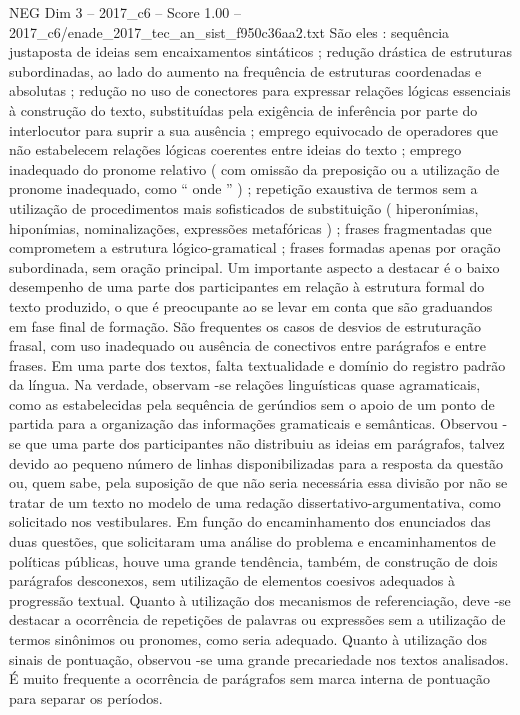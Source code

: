 \begin{textsample}{NEG Dim 3 – 2017\_c6 – Score 1.00 – 2017\_c6/enade\_2017\_tec\_an\_sist\_f950c36aa2.txt}
São eles : sequência justaposta de ideias sem encaixamentos sintáticos ; redução drástica de estruturas subordinadas, ao lado do aumento na frequência de estruturas coordenadas e absolutas ; redução no uso de conectores para expressar relações lógicas essenciais à construção do texto, substituídas pela exigência de inferência por parte do interlocutor para suprir a sua ausência ; emprego equivocado de operadores que não estabelecem relações lógicas coerentes entre ideias do texto ; emprego inadequado do pronome relativo ( com omissão da preposição ou a utilização de pronome inadequado, como “ onde ” ) ; repetição exaustiva de termos sem a utilização de procedimentos mais sofisticados de substituição ( hiperonímias, hiponímias, nominalizações, expressões metafóricas ) ; frases fragmentadas que comprometem a estrutura lógico-gramatical ; frases formadas apenas por oração subordinada, sem oração principal.
Um importante aspecto a destacar é o baixo desempenho de uma parte dos participantes em relação à estrutura formal do texto produzido, o que é preocupante ao se levar em conta que são graduandos em fase final de formação.
São frequentes os casos de desvios de estruturação frasal, com uso inadequado ou ausência de conectivos entre parágrafos e entre frases.
Em uma parte dos textos, falta textualidade e domínio do registro padrão da língua.
Na verdade, observam -se relações linguísticas quase agramaticais, como as estabelecidas pela sequência de gerúndios sem o apoio de um ponto de partida para a organização das informações gramaticais e semânticas.
Observou -se que uma parte dos participantes não distribuiu as ideias em parágrafos, talvez devido ao pequeno número de linhas disponibilizadas para a resposta da questão ou, quem sabe, pela suposição de que não seria necessária essa divisão por não se tratar de um texto no modelo de uma redação dissertativo-argumentativa, como solicitado nos vestibulares.
Em função do encaminhamento dos enunciados das duas questões, que solicitaram uma análise do problema e encaminhamentos de políticas públicas, houve uma grande tendência, também, de construção de dois parágrafos desconexos, sem utilização de elementos coesivos adequados à progressão textual.
Quanto à utilização dos mecanismos de referenciação, deve -se destacar a ocorrência de repetições de palavras ou expressões sem a utilização de termos sinônimos ou pronomes, como seria adequado.
Quanto à utilização dos sinais de pontuação, observou -se uma grande precariedade nos textos analisados.
É muito frequente a ocorrência de parágrafos sem marca interna de pontuação para separar os períodos.

\end{textsample}
